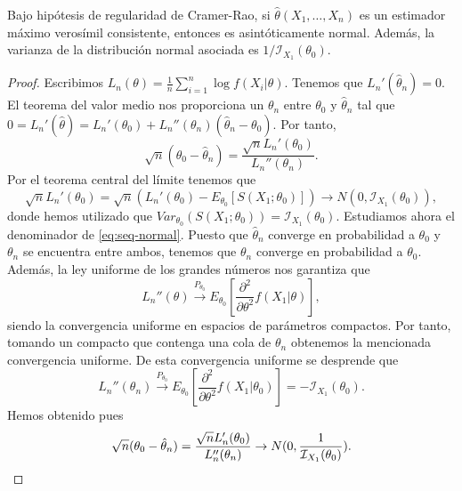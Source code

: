     \begin{thm}
        Bajo hipótesis de regularidad de Cramer-Rao, si $\hat{\theta}(X_1, \ldots, X_n)$ es un estimador máximo verosímil consistente, entonces es asintóticamente normal. Además, la varianza de la distribución normal asociada es $1/\mathcal{I}_{X_1}(\theta_0)$.
    \end{thm}
    \begin{proof}
        Escribimos $L_n(\theta) = \frac{1}{n}\sum_{i = 1}^n \log f(X_i|\theta)$. Tenemos que $L_n'(\hat\theta_n) = 0$. El teorema del valor medio nos proporciona un $\theta_n$ entre $\theta_0$ y $\hat\theta_n$ tal que $0 = L_n'(\hat\theta) = L_n'(\theta_0) + L_n''(\theta_n)(\hat\theta_n - \theta_0)$. Por tanto,
        \begin{equation} \label{eq:seq-normal}
            \sqrt{n}(\theta_0 - \hat\theta_n) = \frac{\sqrt{n}L_n'(\theta_0)}{L_n''(\theta_n)}.
        \end{equation}
        Por el teorema central del límite tenemos que
        \[\sqrt{n}L_n'(\theta_0) = \sqrt{n}(L_n'(\theta_0) - E_{\theta_0}[S(X_1; \theta_0)]) \to N(0, \mathcal{I}_{X_1}(\theta_0)),\]
        donde hemos utilizado que $Var_{\theta_0}(S(X_1; \theta_0)) = \mathcal{I}_{X_1}(\theta_0)$.
        Estudiamos ahora el denominador de \eqref{eq:seq-normal}. Puesto que $\hat\theta_n$ converge en probabilidad a $\theta_0$ y $\theta_n$ se encuentra entre ambos, tenemos que $\theta_n$ converge en probabilidad a $\theta_0$. Además, la ley uniforme de los grandes números nos garantiza que
        \[L_n''(\theta) \xrightarrow{P_{\theta_0}} E_{\theta_0}\left[\frac{\partial^2}{\partial \theta^2}f(X_1|\theta)\right],\]
        siendo la convergencia uniforme en espacios de parámetros compactos. Por tanto, tomando un compacto que contenga una cola de $\theta_n$ obtenemos la mencionada convergencia uniforme. De esta convergencia uniforme se desprende que
        \[L_n''(\theta_n) \xrightarrow{P_{\theta_0}} E_{\theta_0}\left[\frac{\partial^2}{\partial \theta^2}f(X_1|\theta_0)\right] = - \mathcal{I}_{X_1}(\theta_0).\]
        Hemos obtenido pues
        \[\sqrt{n}(\theta_0 - \hat\theta_n) = \frac{\sqrt{n}L_n'(\theta_0)}{L_n''(\theta_n)} \rightarrow N(0, \frac{1}{\mathcal{I}_{X_1}(\theta_0)}). \qedhere\]
    \end{proof}
